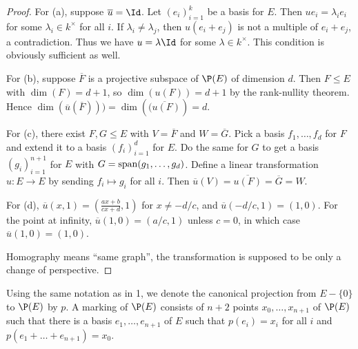 \documentclass{article}
\begin{document}
\begin{proof}
For (a), suppose $\overline u = \Id$. Let $(e_i)_{i=1}^k$ be a basis for $E$.  Then $u e_i = \lambda_i e_i$ for some $\lambda_i \in k^\times$ for all $i$. If $\lambda_i \neq \lambda_j$, then $u(e_i + e_j)$ is not a multiple of $e_i + e_j$, a contradiction.  Thus we have $u = \lambda \Id$ for some $\lambda \in k^\times$.  This condition is obviously sufficient as well.

For (b),  suppose $\overline F$ is a projective subspace of $\P(E)$ of dimension $d$.  Then $F \le E$ with $\dim(F) = d + 1$, so $\dim(u(F)) = d + 1$ by the rank-nullity theorem. Hence $\dim(\overline u (\overline F))) = \dim(\overline{(u(F)}) = d$.

For (c), there exist $F,G \le E$ with $V = \overline F$ and $W = \overline G$. Pick a basis $f_1, \ldots, f_d$ for $F$ and extend it to a basis $(f_i)_{i=1}^d$ for $E$.  Do the same for $G$ to get a basis $(g_i)_{i=1}^{n+1}$ for $E$ with $G = \operatorname{span}(g_1, \ldots, g_d)$.  Define a linear transformation $u:E \to E$ by sending $f_i \mapsto g_i$ for all $i$. Then $\overline u(V) = \overline {u(F)} = \overline G = W$.

For (d),  $\overline u (x,1) = (\frac{ax +b}{cx + d}, 1)$ for $x \neq -d/c$, and $\overline u (-d/c, 1) = (1, 0)$.  For the point at infinity, $\overline u (1, 0) = (a/c, 1)$ unless $c = 0$, in which case $\overline u (1, 0) = (1, 0)$.

Homography means ``same graph'', the transformation is supposed to be only a change of perspective.
\end{proof}


 Using the same notation as in 1, we denote the canonical projection from $E - \{0\}$ to $\P(E)$ by $p$. A marking of $\P(E)$ consists of $n + 2$ points $x_0, \ldots, x_{n+1}$ of $\P(E)$ such that there is a basis $e_1, \ldots, e_{n+1}$ of $E$ such that $p(e_i) = x_i$ for all $i$ and $p(e_1 + \ldots + e_{n+1}) = x_0$.
\end{document}
